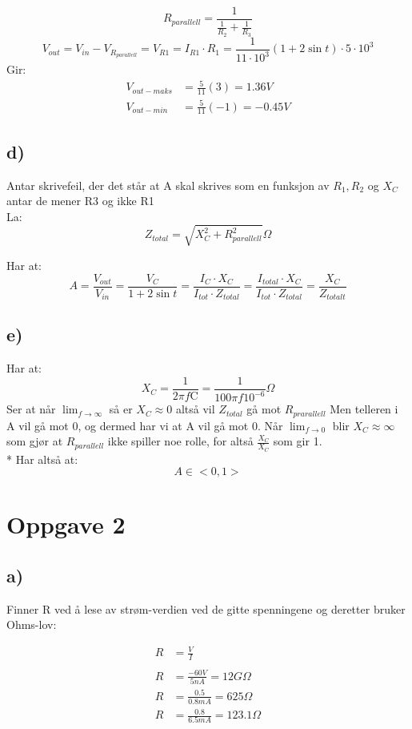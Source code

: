 \documentclass[a4paper, norsk, twoside, 10pt]{article}
\begin{document}
\[R_{parallell} = \frac{1}{\frac{1}{R_{2}} + \frac{1}{R_{3}}}\]
\[V_{out} = V_{in} - V_{R_{parallell}} = V_{R1} = I_{R1}\cdot R_{1} =  \frac{1}{11\cdot 10^3}(1 + 2\sin{t}) \cdot 5 \cdot 10^{3} \]
Gir:
\begin{align*}
  V_{out-maks} &=  \frac{5}{11}(3) = 1.36 V \\
  V_{out-min} &= \frac{5}{11}(-1) = -0.45 V
\end{align*}


\subsection*{d)}
Antar skrivefeil, der det står at A skal skrives som en funksjon av $R_{1}, R_{2}$ og $X_{C}$ antar de mener R3 og ikke R1\\
La:
\[Z_{total} = \sqrt{X_{C}^{2} + R_{parallell}^{2}} \Omega\]
 
Har at: \[A = \frac{V_{out}}{V_{in}} = \frac{V_{C}}{1+ 2\sin{t}} = \frac{I_{C} \cdot X_{C}}{I_{tot} \cdot Z_{total}}
= \frac{I_{total} \cdot X_{C}}{I_{tot} \cdot Z_{total}}= \frac{X_{C}}{Z_{totalt}}\]


\subsection*{e)}
Har at: \[X_{C} = \frac{1}{2\pi f \mathrm{C}} = \frac{1}{100\pi f 10^{-6}} \Omega\]
Ser at når $\lim_{f \to \infty}$ så er $X_{C} \approx 0$ altså vil $Z_{total}$ gå mot $R_{prarallell}$ Men telleren i A vil gå mot 0, og dermed har vi at A vil gå mot 0. Når $\lim_{f \to 0}$ blir  $X_{C} \approx \infty$ som gjør at $R_{parallell}$ ikke spiller noe rolle, for altså $\frac{X_{C}}{X_{C}}$ som gir 1.\\*
Har altså at:
\[A \in <0,1>\]


\newpage
\section*{Oppgave 2}
\subsection*{a)}

Finner R ved å lese av strøm-verdien ved de gitte spenningene og deretter bruker Ohms-lov:

\begin{align*}R &= \frac{V}{I}\\
  \\
  R &= \frac{-60 V}{5nA} = 12 G \Omega\\
  R &= \frac{0.5}{0.8mA} = 625 \Omega \\
  R &= \frac{0.8}{6.5mA} = 123.1 \Omega \\
\end{align*}
\end{document}
